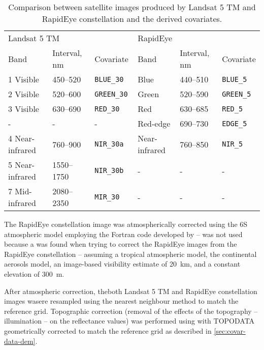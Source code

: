 \begin{table}[ht]
 \caption{Comparison between satellite images produced by Landsat 5 TM and RapidEye constellation and 
 the derived covariates.}
 \label{tab:chap05-covar-data-satellites}
 \centering
 {\small
 \begin{tabular}{llllll}
  \hline
  \multicolumn{3}{l}{Landsat 5 TM}                       & \multicolumn{3}{l}{RapidEye}                     \\
  Band            & Interval, \si{nm}    & Covariate     & Band         & Interval, \si{\nm} & Covariate    \\
  \hline
  1 Visible       &\numrange{450}{520}   &\tt{BLUE\_30}  &Blue          &\numrange{440}{510} &\tt{BLUE\_5}  \\
  2 Visible       &\numrange{520}{600}   &\tt{GREEN\_30} &Green         &\numrange{520}{590} &\tt{GREEN\_5} \\
  3 Visible       &\numrange{630}{690}   &\tt{RED\_30}   &Red           &\numrange{630}{685} &\tt{RED\_5}   \\
  -               &-                     & -             &Red-edge      &\numrange{690}{730} &\tt{EDGE\_5}  \\
  4 Near-infrared &\numrange{760}{900}   &\tt{NIR\_30a}  &Near-infrared &\numrange{760}{850} &\tt{NIR\_5}   \\
  5 Near-infrared &\numrange{1550}{1750} &\tt{NIR\_30b}  & -            & -                  & -            \\
  7 Mid-infrared  &\numrange{2080}{2350} &\tt{MIR\_30}   & -            & -                  & -            \\
  \hline
 \end{tabular}}
\end{table}

The RapidEye constellation image was atmospherically corrected using the 6S atmospheric model 
\cite{VermoteEtAl1997} employing the Fortran code developed by  -- 
 was not used because a \atcorrbug{} was found when trying to correct the RapidEye images from 
the RapidEye 
constellation -- assuming a tropical atmospheric model, the continental aerosols model, an image-based 
visibility estimate of \SI{20}{\km}, and a constant elevation of \SI{300}{\m}.

After atmospheric correction, theboth Landsat 5 TM and RapidEye constellation images wasere resampled using 
the 
nearest neighbour method to match the reference grid. Topographic correction (removal of the effects of the 
topography -- illumination -- on the reflectance values) was performed using  with TOPODATA 
geometrically corrected to match the reference grid as described in \autoref{sec:covar-data-dem}.

